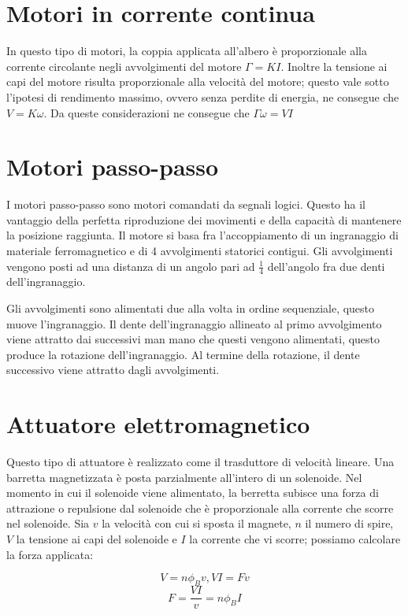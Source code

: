 \section{Motori in corrente continua}
In questo tipo di motori, la coppia applicata all'albero è
proporzionale alla corrente circolante negli avvolgimenti del motore
$\Gamma = KI$. Inoltre la tensione ai capi del motore risulta
proporzionale alla velocità del motore; questo vale sotto l'ipotesi di
rendimento massimo, ovvero senza perdite di energia, ne consegue che
$V=K\omega$. Da queste considerazioni ne consegue che
$\Gamma\omega=VI$

\section{Motori passo-passo}
I motori passo-passo sono motori comandati da segnali logici. Questo
ha il vantaggio della perfetta riproduzione dei movimenti e della
capacità di mantenere la posizione raggiunta. Il motore si basa fra
l'accoppiamento di un ingranaggio di materiale ferromagnetico e di 4
avvolgimenti statorici contigui. Gli avvolgimenti vengono posti ad
una distanza di un angolo pari ad $\frac{1}{4}$ dell'angolo fra due
denti dell'ingranaggio.

Gli avvolgimenti sono alimentati due alla volta in ordine
sequenziale, questo muove l'ingranaggio. Il dente dell'ingranaggio
allineato al primo avvolgimento viene attratto dai successivi man
mano che questi vengono alimentati, questo produce la rotazione
dell'ingranaggio. Al termine della rotazione, il dente successivo
viene attratto dagli avvolgimenti.

\section{Attuatore elettromagnetico}
Questo tipo di attuatore è realizzato come il trasduttore di velocità
lineare. Una barretta magnetizzata è posta parzialmente all'intero di
un solenoide. Nel momento in cui il solenoide viene alimentato, la
berretta subisce una forza di attrazione o repulsione dal solenoide
che è proporzionale alla corrente che scorre nel solenoide. Sia $v$ la
velocità con cui si sposta il magnete, $n$ il numero di spire, $V$ la
tensione ai capi del solenoide e $I$ la corrente che vi scorre;
possiamo calcolare la forza applicata:

	\[V=n\phi_Bv, VI=Fv\]
	\[F= \frac{VI}{v}=n\phi_B I\]